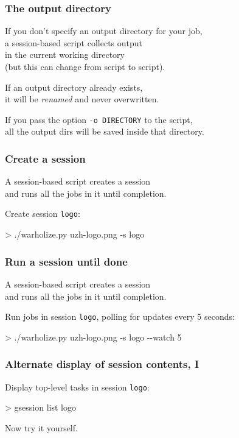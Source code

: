 \documentclass[english,serif,mathserif,usenames,dvipsnames]{beamer}
\begin{document}
\begin{frame}
  \frametitle{The output directory}
  \begin{center}
    If you don't specify an output directory for your job, \\ a
    session-based script collects output \\ in the current working
    directory \\ (but this can change from script to script).

    \+ If an output directory already exists, \\ it will be
    \textit{renamed} and never overwritten.

    \+ If you pass the option \lstinline|-o DIRECTORY| to the script, \\
    all the output dirs will be saved inside that directory.
  \end{center}
\end{frame}


\begin{frame}
  \frametitle{Create a session}

  A session-based script \alert{creates a session}
  \\
  and runs all the jobs in it until completion.

  \+ Create session \texttt{logo}:
\begin{semiverbatim}
    > ./warholize.py uzh-logo.png -s logo
\end{semiverbatim}
\end{frame}


\begin{frame}
  \frametitle{Run a session until done}

  A session-based script creates a session
  \\
  and \alert{runs all the jobs in it until completion.}

  \+ Run jobs in session \texttt{logo},
  polling for updates every 5 seconds:
\begin{semiverbatim}
    > ./warholize.py uzh-logo.png -s logo -{}-watch 5
\end{semiverbatim}

  \+ 
\end{frame}


\begin{frame}
  \frametitle{Alternate display of session contents, I}

  Display top-level tasks in session \texttt{logo}:
\begin{semiverbatim}
    > gsession list logo
\end{semiverbatim}

  \begin{exercise}
    Now try it yourself.
  \end{exercise}
\end{frame}
\end{document}
